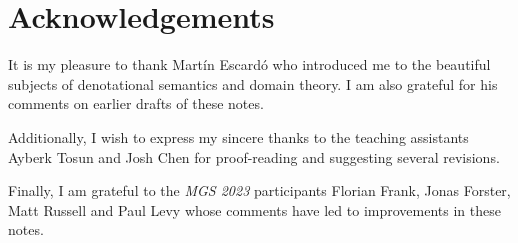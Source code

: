 \chapter{Acknowledgements}

It is my pleasure to thank Mart\'in Escard\'o who introduced me to the beautiful
subjects of denotational semantics and domain theory. I am also grateful for his
comments on earlier drafts of these notes.

Additionally, I wish to express my sincere thanks to the teaching assistants
Ayberk Tosun and Josh Chen for proof-reading and suggesting several
revisions.

Finally, I am grateful to the \emph{MGS 2023} participants Florian Frank, Jonas
Forster, Matt Russell and Paul Levy whose comments have led to improvements in
these notes.


